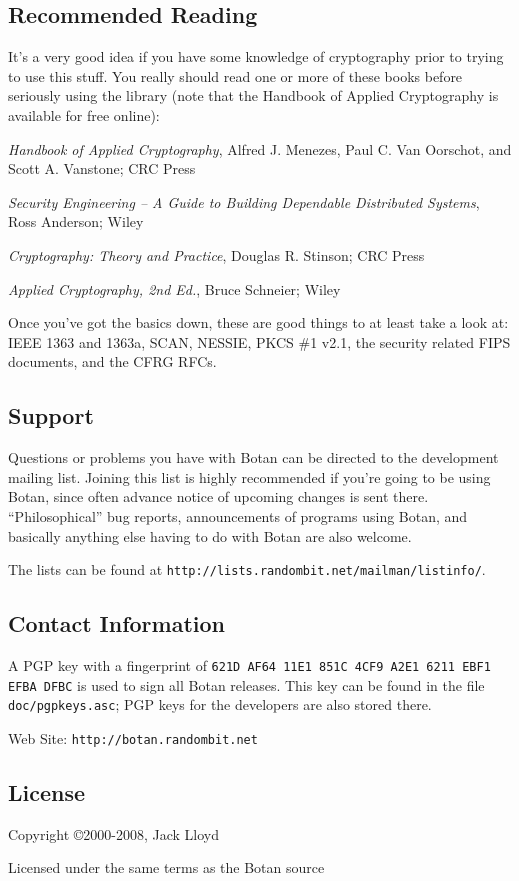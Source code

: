 \documentclass{article}
\newcommand{\filename}[1]{\texttt{#1}}
\newcommand{\url}[1]{\texttt{#1}}
\begin{document}
\subsection{Recommended Reading}

It's a very good idea if you have some knowledge of cryptography prior
to trying to use this stuff. You really should read one or more of
these books before seriously using the library (note that the Handbook
of Applied Cryptography is available for free online):

\setlength{\parskip}{5pt}

\noindent
\textit{Handbook of Applied Cryptography}, Alfred J. Menezes,
Paul C. Van Oorschot, and Scott A. Vanstone; CRC Press

\noindent
\textit{Security Engineering -- A Guide to Building Dependable Distributed
Systems}, Ross Anderson; Wiley

\noindent
\textit{Cryptography: Theory and Practice}, Douglas R. Stinson; CRC Press

\noindent
\textit{Applied Cryptography, 2nd Ed.}, Bruce Schneier; Wiley

\noindent
Once you've got the basics down, these are good things to at least take a look
at: IEEE 1363 and 1363a, SCAN, NESSIE, PKCS \#1 v2.1, the security related FIPS
documents, and the CFRG RFCs.

\subsection{Support}

Questions or problems you have with Botan can be directed to the
development mailing list. Joining this list is highly recommended if
you're going to be using Botan, since often advance notice of upcoming
changes is sent there. ``Philosophical'' bug reports, announcements of
programs using Botan, and basically anything else having to do with
Botan are also welcome.

The lists can be found at
\url{http://lists.randombit.net/mailman/listinfo/}.

\subsection{Contact Information}

A PGP key with a fingerprint of
\verb|621D AF64 11E1 851C 4CF9 A2E1 6211 EBF1 EFBA DFBC| is used to sign all
Botan releases. This key can be found in the file \filename{doc/pgpkeys.asc};
PGP keys for the developers are also stored there.

\vskip 5pt \noindent
Web Site: \url{http://botan.randombit.net}

\subsection{License}

Copyright \copyright  2000-2008, Jack Lloyd

Licensed under the same terms as the Botan source
\end{document}

